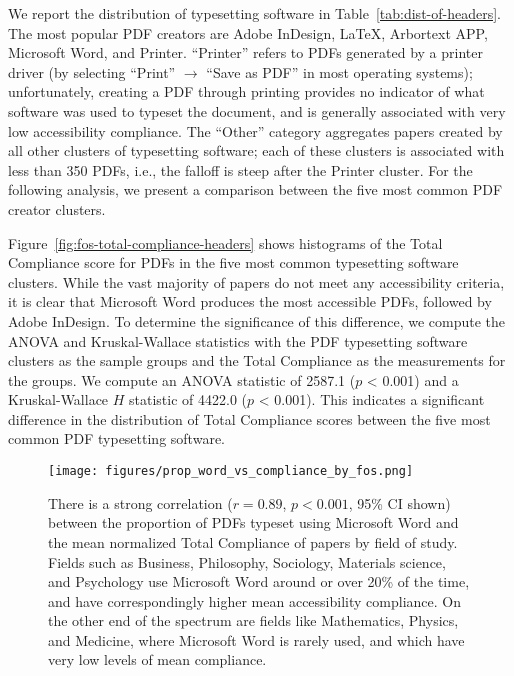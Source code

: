 We report the distribution of typesetting software in Table~\ref{tab:dist-of-headers}. The most popular PDF creators are Adobe InDesign, LaTeX, Arbortext APP, Microsoft Word, and Printer. ``Printer'' refers to PDFs generated by a printer driver (by selecting ``Print'' $\rightarrow$ ``Save as PDF'' in most operating systems); unfortunately, creating a PDF through printing provides no indicator of what software was used to typeset the document, and is generally associated with very low accessibility compliance. The ``Other'' category aggregates papers created by all other clusters of typesetting software; each of these clusters is associated with less than 350 PDFs, i.e., the falloff is steep after the Printer cluster. For the following analysis, we present a comparison between the five most common PDF creator clusters.

Figure~\ref{fig:fos-total-compliance-headers} shows histograms of the Total Compliance score for PDFs in the five most common typesetting software clusters. While the vast majority of papers do not meet any accessibility criteria, it is clear that Microsoft Word produces the most accessible PDFs, followed by Adobe InDesign. 
To determine the significance of this difference, we compute the ANOVA and Kruskal-Wallace \citep{Kruskal1952UseOR} statistics with the PDF typesetting software clusters as the sample groups and the Total Compliance as the measurements for the groups. We compute an ANOVA statistic of 2587.1 ($p$ < 0.001) and a Kruskal-Wallace $H$ statistic of 4422.0 ($p$ < 0.001). This indicates a significant difference in the distribution of Total Compliance scores between the five most common PDF typesetting software.

\begin{figure}[t!]
  \centering
    \texttt{[image: figures/prop\_word\_vs\_compliance\_by\_fos.png]}
  \caption{There is a strong correlation ($r = 0.89$, $p < 0.001$, 95\% CI shown) between the proportion of PDFs typeset using Microsoft Word and the mean normalized Total Compliance of papers by field of study. Fields such as Business, Philosophy, Sociology, Materials science, and Psychology use Microsoft Word around or over 20\% of the time, and have correspondingly higher mean accessibility compliance. On the other end of the spectrum are fields like Mathematics, Physics, and Medicine, where Microsoft Word is rarely used, and which have very low levels of mean compliance.}
  \label{fig:prop_word_by_fos}
\end{figure}

